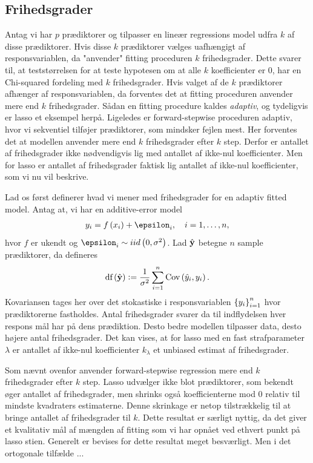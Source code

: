 \subsection{Frihedsgrader}
Antag vi har \(p\) prædiktorer og tilpasser en lineær regressions model udfra \(k\) af disse prædiktorer.
Hvis disse \(k\) prædiktorer vælges uafhængigt af responsvariablen, da "anvender" fitting proceduren \(k\) frihedsgrader.
Dette svarer til, at teststørrelsen for at teste hypotesen om at alle \(k\) koefficienter er 0, har en Chi-squared fordeling med \(k\) frihedsgrader.
%
Hvis valget af de \(k\) prædiktorer afhænger af responsvariablen, da forventes det at fitting proceduren anvender mere end \(k\) frihedsgrader. 
Sådan en fitting procedure kaldes \textit{adaptiv}, og tydeligvis er lasso et eksempel herpå.
Ligeledes er forward-stepwise proceduren adaptiv, hvor vi sekventiel tilføjer prædiktorer, som mindsker fejlen mest.
Her forventes det at modellen anvender mere end \(k\) frihedsgrader efter \(k\) step.
Derfor er antallet af frihedsgrader ikke nødvendigvis lig med antallet af ikke-nul koefficienter.
Men for lasso er antallet af frihedsgrader faktisk lig antallet af ikke-nul koefficienter, som vi nu vil beskrive.

Lad os først definerer hvad vi mener med frihedsgrader for en adaptiv fitted model. 
Antag at, vi har en additive-error model
\begin{align*}
y_i = f \del{x_i} + \epsilon_i, \quad i = 1, \ldots, n,
\end{align*}
hvor \(f\) er ukendt og \(\epsilon_i \sim iid \del{0, \sigma^2}\).
Lad \(\hat{\mathbf{y}}\) betegne \(n\) sample prædiktorer, da defineres 
\begin{align}
\text{df}\del{\hat{\y}} := \frac{1}{\sigma^2} \sum_{i=1}^n \text{Cov}\del{\hat{y}_i, y_i}. \label{eq:df_lasso}
\end{align}
Kovariansen tages her over det stokastiske i responsvariablen \(\cbr{y_i}_{i=1}^n\) hvor prædiktorerne fastholdes.
Antal frihedsgrader svarer da til indflydelsen hver respons mål har på dens prædiktion.
Desto bedre modellen tilpasser data, desto højere antal frihedsgrader.
Det kan vises, at for lasso med en fast strafparameter \(\lambda\) er antallet af ikke-nul koefficienter \(k_\lambda\) et unbiased estimat af frihedsgrader.

Som nævnt ovenfor anvender forward-stepwise regression mere end \(k\) frihedsgrader efter \(k\) step.
Lasso udvælger ikke blot prædiktorer, som bekendt øger antallet af frihedsgrader, men shrinks også koefficienterne mod 0 relativ til mindste kvadraters estimaterne.
Denne skrinkage er netop tilstrækkelig til at bringe antallet af frihedsgrader til \(k\).
Dette resultat er særligt nyttig, da det giver et kvalitativ mål af mængden af fitting som vi har opnået ved ethvert punkt på lasso stien.
Generelt er bevises for dette resultat meget besværligt.
Men i det ortogonale tilfælde ...

